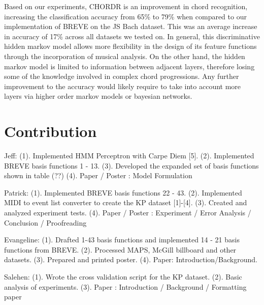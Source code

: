 \documentclass{article} %
\begin{document}
Based on our experiments, CHORDR is an improvement in chord recognition, increasing the classification accuracy from 65\% to 79\% when compared to our implementation of BREVE on the JS Bach dataset. This was an average increase in accuracy of 17\% across all datasets we tested on. In general, this discriminative hidden markov model allows more flexibility in the design of its feature functions through the incorporation of musical analysis. On the other hand, the hidden markov model is limited to information between adjacent layers, therefore losing some of the knowledge involved in complex chord progressions. Any further improvement to the accuracy would likely require to take into account more layers via higher order markov models or bayesian networks.

\section{Contribution}

Jeff: (1). Implemented HMM Perceptron with Carpe Diem [5]. (2). Implemented BREVE basis functions 1 - 13. (3). Developed the expanded set of basis functions shown in table (??) (4). Paper / Poster : Model Formulation

Patrick: (1). Implemented BREVE basis functions 22 - 43. (2). Implemented MIDI to event list converter to create the KP dataset [1]-[4]. (3). Created and analyzed experiment tests. (4). Paper / Poster : Experiment / Error Analysis / Conclusion / Proofreading

Evangeline: (1). Drafted 1-43 basis functions and implemented 14 - 21 basis functions from BREVE. (2). Processed MAPS, McGill billboard and other datasets. (3). Prepared and printed poster. (4). Paper: Introduction/Background.

Salehen: (1). Wrote the cross validation script for the KP dataset. (2). Basic analysis of experiments. (3). Paper : Introduction / Background / Formatting paper
\end{document}
